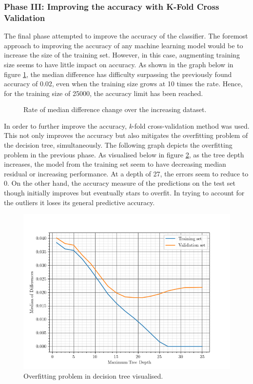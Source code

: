 \subsubsection{Phase III: Improving the accuracy with K-Fold Cross Validation}\label{rr3}
The final phase  attempted to improve the accuracy of the classifier. The foremost approach to improving the accuracy of any machine learning model would be to increase the size of the training set. However, in this case, augmenting training size seems to have little impact on accuracy. As shown in the graph below in figure \ref{fig:dsg}, the median difference has difficulty surpassing the previously found accuracy of 0.02, even when the training size grows at 10 times the rate. Hence, for the training size of 25000, the accuracy limit has been reached.
\begin{figure}[H]
	\centering
	\caption{Rate of median difference change over the increasing dataset.}
	\label{fig:dsg}
\end{figure}
In order to further improve the accuracy, \textit{k}-fold cross-validation method was used. This not only improves the accuracy but also mitigates the overfitting problem of the decision tree, simultaneously. The following graph depicts the overfitting problem in the previous phase. As visualised below in figure \ref{fig:ofx}, as the tree depth increases, the model from the training set seem to have decreasing median residual or increasing performance. At a depth of 27, the errors seem to reduce to 0. On the other hand, the accuracy measure of the predictions on the test set though initially improves but eventually stars to overfit. In trying to account for the outliers it loses its general predictive accuracy.
\begin{figure}[H]
	\centering
	\includegraphics[width=\linewidth,keepaspectratio]{images/misc/ofit.png}
	\caption{Overfitting problem in decision tree visualised.}
	\label{fig:ofx}
\end{figure}
